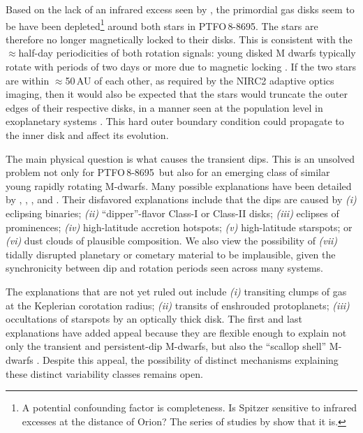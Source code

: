 \documentclass[12pt,twocolumn,tighten]{aastex62}
\newcommand{\ptfo}{PTFO$\,$8-8695}
\begin{document}
Based on the lack of an infrared excess seen by \citet{yu_tests_2015},
the primordial gas disks seem to be have been depleted\footnote{A
potential confounding factor is completeness. Is Spitzer sensitive to
infrared excesses at the distance of Orion? The series of studies by
\cite{hernandez_spitzer_2006,hernandez_spitzer_ob1_2007,hernandez_spitzer_sig_2007,hernandez_spitzer_2009}
show that it is.} around both stars in \ptfo. The stars are therefore
no longer magnetically locked to their disks.  This is consistent with
the $\approx$half-day periodicities of both rotation signals: young
disked M dwarfs typically rotate with periods of two days or more due
to magnetic locking \citep[{\it e.g.},][]{rebull_rotation_2020}.  If
the two stars are within $\approx$50$\,$AU of each other, as required
by the NIRC2 adaptive optics imaging, then it would also be expected
that the stars would truncate the outer edges of their respective
disks, in a manner seen at the population level in exoplanetary
systems \citep{kraus_impact_2016,moe_impact_2019}.  This hard outer
boundary condition could propagate to the inner disk and affect its
evolution.

The main physical question is what causes the transient dips. This is
an unsolved problem not only for \ptfo\ but also for an emerging class
of similar young rapidly rotating M-dwarfs.  Many possible
explanations have been detailed by \citet{rebull_rotation_2016},
\citet{david_transient_2017}, \citet{stauffer_orbiting_2017}, and
\citet{zhan_complex_2019}.  Their disfavored explanations include that
the dips are caused by
{\it (i)} eclipsing binaries;
{\it (ii)} ``dipper''-flavor Class-I or Class-II disks;
{\it (iii)} eclipses of prominences;
{\it (iv)} high-latitude accretion hotspots;
{\it (v)} high-latitude starspots;
or
{\it (vi)} dust clouds of plausible composition.
We also view the possibility of {\it (vii)} tidally disrupted
planetary or cometary material to be implausible, given the
synchronicity between dip and rotation periods seen across many
systems.

The explanations that are not yet ruled out include {\it (i)}
transiting clumps of gas at the Keplerian corotation radius; {\it
(ii)} transits of enshrouded protoplanets; {\it (iii)} occultations of
starspots by an optically thick disk.  
The first and last explanations
have added appeal because they are flexible enough to explain not only
the transient and persistent-dip M-dwarfs, but also the ``scallop
shell'' M-dwarfs \citep{stauffer_orbiting_2017}.  Despite this appeal,
the possibility of distinct mechanisms explaining these distinct
variability classes remains open.
\end{document}

